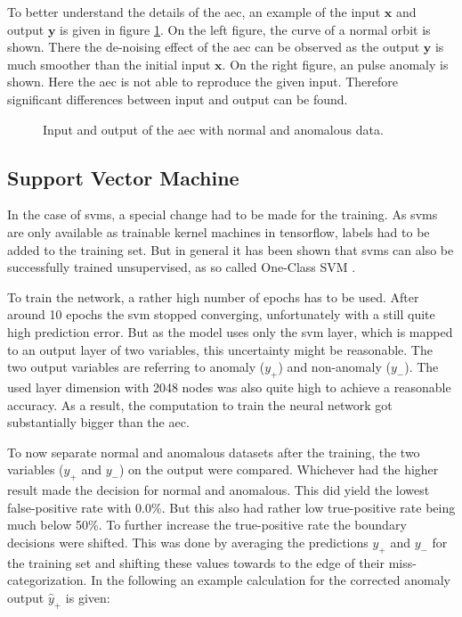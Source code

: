 	To better understand the details of the \ac{aec}, an example of the input $\mathbf{x}$ and output $\mathbf{y}$ is given in figure \ref{f:aec_deep}. On the left figure, the curve of a normal orbit is shown. There the de-noising effect of the \ac{aec} can be observed as the output $\mathbf{y}$ is much smoother than the initial input $\mathbf{x}$. On the right figure, an pulse anomaly is shown. Here the \ac{aec} is not able to reproduce the given input. Therefore significant differences between input and output can be found.
	
	\begin{figure}[htb]
	\centering
	\begin{minipage}[t]{0.45\textwidth}
			
	\end{minipage}
	\begin{minipage}[t]{0.45\textwidth}
			
	\end{minipage}
	\caption{Input and output of the \ac{aec} with normal and anomalous data.}
	\label{f:aec_deep}
	\end{figure}

	\subsection{Support Vector Machine}
	In the case of \acp{svm}, a special change had to be made for the training. As \acp{svm} are only available as trainable kernel machines \cite{tf-svm} in tensorflow, labels had to be added to the training set. But in general it has been shown that \acp{svm} can also be successfully trained unsupervised, as so called One-Class SVM \cite{one-class-svm}.
	
	To train the network, a rather high number of epochs has to be used. After around 10 epochs the \ac{svm} stopped converging, unfortunately with a still quite high prediction error. But as the model uses only the \ac{svm} layer, which is mapped to an output layer of two variables, this uncertainty might be reasonable. The two output variables are referring to anomaly ($y_+$) and non-anomaly ($y_-$). \newline
	The used layer dimension with 2048 nodes was also quite high to achieve a reasonable accuracy. As a result, the computation to train the neural network got substantially bigger than the \ac{aec}.
		
	To now separate normal and anomalous datasets after the training, the two variables ($y_+$ and $y_-$) on the output were compared. Whichever had the higher result made the decision for normal and anomalous. This did yield the lowest false-positive rate with 0.0\%. But this also had rather low true-positive rate being much below 50\%. \newline
	To further increase the true-positive rate the boundary decisions were shifted. This was done by averaging the predictions $y_+$ and $y_-$ for the training set and shifting these values towards to the edge of their miss-categorization. In the following an example calculation for the corrected anomaly output $\hat{y}_+$ is given:
	
